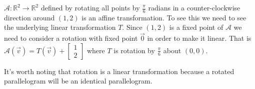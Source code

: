 \begin{example}
$\mathcal{A}:\mathbb{R}^2 \to \mathbb{R}^2$ defined by rotating all points by $\frac{\pi}{6}$ radians in a counter-clockwise direction around $(1,2)$ is an affine transformation. To see this we need to see the underlying linear transformation $T$. Since $(1,2)$ is a fixed point of $\mathcal{A}$ we need to consider a rotation with fixed point $\vec{0}$ in order to make it linear. That is $\mathcal{A}(\vec{v})=T(\vec{v})+\begin{bmatrix} 1 \\ 2 \end{bmatrix}$
where $T$ is rotation by $\frac{\pi}{6}$ about $(0,0)$.

It's worth noting that rotation is a linear transformation because a rotated parallelogram will be an identical parallelogram. 


\end{example}
